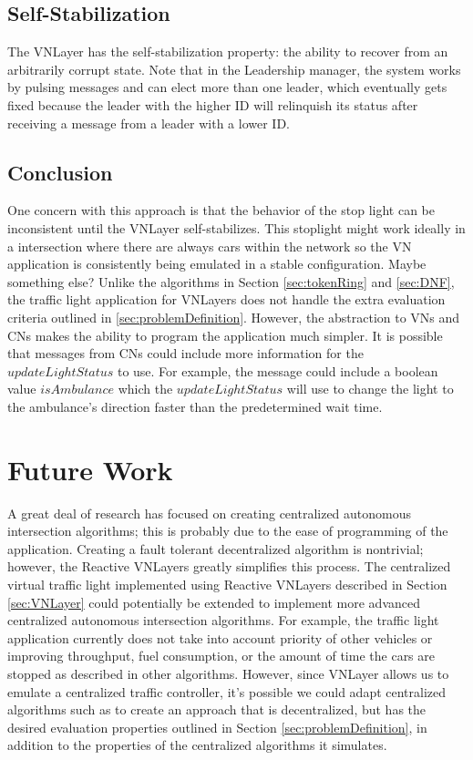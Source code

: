 \documentclass[12pt]{article}
\begin{document}
\subsection{Self-Stabilization}
The VNLayer has the self-stabilization property:  the ability to recover from an arbitrarily corrupt state\cite{ssvnlayer}.  Note that in the Leadership manager, the system works by pulsing messages and can elect more than one leader, which eventually gets fixed because the leader with the higher ID will relinquish its status after receiving a message from a leader with a lower ID. 
\subsection{Conclusion}
One concern with this approach is that the behavior of the stop light can be inconsistent until the VNLayer  self-stabilizes. This stoplight might work ideally in a intersection where there are always cars within the network so the VN application is consistently being emulated in a stable configuration. 
Maybe something else? %
Unlike the algorithms in Section \ref{sec:tokenRing} and \ref{sec:DNF}, the traffic light application for VNLayers does not handle the extra evaluation criteria outlined in \ref{sec:problemDefinition}.  However, the abstraction to VNs and CNs makes the ability to program the application much simpler.  It is possible that messages from CNs could include more information for the $updateLightStatus$ to use.  For example, the message could include a boolean value $isAmbulance$ which the $updateLightStatus$ will use to change the light to the ambulance's direction faster than the predetermined wait time. 

\section{Future Work}
\label{sec:futureWork}
A great deal of research has focused on creating centralized autonomous intersection algorithms; this is probably due to the ease of programming of the application.  Creating a fault tolerant decentralized algorithm is nontrivial;  however, the Reactive VNLayers greatly simplifies this process.  The  centralized virtual traffic light implemented using Reactive VNLayers described in Section \ref{sec:VNLayer} could potentially be extended to implement more advanced centralized autonomous intersection algorithms.  For example, the traffic light application currently does not take into account priority of other vehicles or improving throughput,  fuel consumption, or the amount of time the cars are stopped as described in other algorithms.  However, since VNLayer allows us to emulate a centralized traffic controller, it's possible we could adapt centralized algorithms such as %
to create an approach that is decentralized, but has the desired evaluation properties outlined in Section \ref{sec:problemDefinition}, in addition to the properties of the centralized algorithms it simulates.   %
\end{document}
